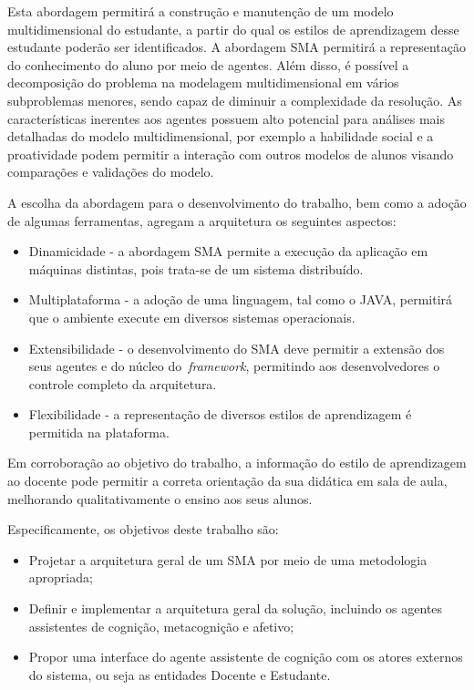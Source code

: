 Esta abordagem permitirá a construção e manutenção de um modelo multidimensional do estudante, a partir do qual os estilos de aprendizagem desse estudante poderão ser identificados. A abordagem SMA permitirá a representação do conhecimento do aluno por meio de agentes. Além disso, é possível a decomposição do problema na modelagem multidimensional em vários subproblemas menores, sendo capaz de diminuir a complexidade da resolução. As características inerentes aos agentes possuem alto potencial para análises mais detalhadas do modelo multidimensional, por exemplo a habilidade social e a proatividade podem permitir a interação com outros modelos de alunos visando comparações e validações do modelo.

A escolha da abordagem para o desenvolvimento do trabalho, bem como a adoção de algumas ferramentas, agregam a arquitetura os seguintes aspectos:
\begin{itemize}
 	\item Dinamicidade - a abordagem SMA permite a execução da aplicação em máquinas distintas, pois trata-se de um sistema distribuído.
	\item Multiplataforma - a adoção de uma linguagem, tal como o JAVA, permitirá que o ambiente execute em diversos sistemas operacionais.
	\item Extensibilidade - o desenvolvimento do SMA deve permitir a extensão dos seus agentes e do núcleo do~\emph{framework}, permitindo aos desenvolvedores o controle completo da arquitetura.
	\item Flexibilidade - a representação de diversos estilos de aprendizagem é permitida na plataforma.
\end{itemize}

Em corroboração ao objetivo do trabalho, a informação do estilo de aprendizagem ao docente pode permitir a correta orientação da sua didática em sala de aula, melhorando qualitativamente o ensino aos seus alunos.

Especificamente, os objetivos deste trabalho são:
\begin{itemize}
 	\item Projetar a arquitetura geral de um SMA por meio de uma metodologia apropriada;
	\item Definir e implementar a arquitetura geral da solução, incluindo os agentes assistentes de cognição, metacognição e afetivo;
	\item Propor uma interface do agente assistente de cognição com os atores externos do sistema, ou seja as entidades Docente e Estudante.
\end{itemize}

